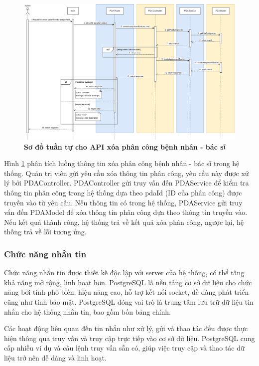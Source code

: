 \begin{figure}[H]
  \centering
  \includegraphics[scale=0.4]{Images/sequence_api/deleteAssignment.png}
  \caption[Sơ đồ tuần tự cho API xóa phân công bệnh nhân - bác sĩ]{\bfseries \fontsize{12pt}{0pt}
  \selectfont Sơ đồ tuần tự cho API xóa phân công bệnh nhân - bác sĩ }
  \label{api_deletePDA} %
\end{figure}
Hình \ref{api_deletePDA} phân tích luồng thông tin xóa phân công bệnh nhân - bác sĩ trong hệ thống. Quản trị viên gửi yêu cầu xóa thông tin phân công, 
yêu cầu này được xử lý bởi PDAController. PDAController gửi truy vấn đến PDAService để kiểm tra thông tin phân công trong hệ thống dựa theo pdaId (ID của phân công) được truyền vào từ yêu cầu. 
Nếu thông tin có trong hệ thống, PDAService gửi truy vấn đến PDAModel để xóa thông tin phân công 
dựa theo thông tin truyền vào. Nếu kết quả thành công, hệ thống trả về kết quả xóa phân công, ngược lại, hệ thống trả về lỗi tương ứng.
\subsubsection{Chức năng nhắn tin}
Chức năng nhắn tin được thiết kế độc lập với server của hệ thống, có thể tăng khả năng mở rộng, linh hoạt hơn. 
PostgreSQL là nền tảng cơ sở dữ liệu cho chức năng bởi tính phổ biến, hiệu năng cao, hỗ trợ kết nối socket, dễ dàng phát triển cũng như tính bảo mật. PostgreSQL đóng vai trò là trung tâm lưu trữ dữ liệu tin nhắn cho hệ thống nhắn tin, bao gồm bốn bảng chính. 

Các hoạt động liên quan đến tin nhắn như xử lý, gửi và thao tác đều được thực hiện thông qua truy vấn và truy cập trực tiếp vào cơ sở dữ liệu. PostgreSQL cung cấp nhiều
ví dụ và câu lệnh truy vấn sẵn có, giúp việc truy cập và thao tác dữ liệu trở nên dễ dàng và linh hoạt.

